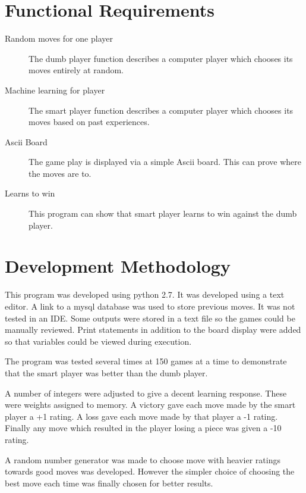 \documentclass{article}
\begin{document}
 

\section{Functional Requirements}
\begin{description}
\item[Random moves for one player]
The dumb player function describes a computer player which chooses its moves entirely at random.
\item[Machine learning for player]
The smart player function describes a computer player which chooses its moves based on past experiences.
\item[Ascii Board]
The game play is displayed via a simple Ascii board. This can prove where the moves are to.
\item[Learns to win]
This program can show that smart player learns to win against the dumb player.
\end{description} 

\section{Development Methodology}
\begin{description}
This program was developed using python 2.7. It was developed using a text editor. A link to a mysql database was used to store previous moves. It was not tested in an IDE. Some outputs were stored in a text file so the games could be manually reviewed. Print statements in addition to the board display were added so that variables could be viewed during execution.

The program was tested several times at 150 games at a time to demonstrate that the smart player was better than the dumb player.

A number of integers were adjusted to give a decent learning response. These were weights assigned to memory. A victory gave each move made by the smart player a +1 rating. A loss gave each move made by that player a -1 rating. Finally any move which resulted in the player losing a piece was given a -10 rating.

A random number generator was made to choose move with heavier ratings towards good moves was developed. However the simpler choice of choosing the best move each time was finally chosen for better results.
\end{description}
 
\end{document}
